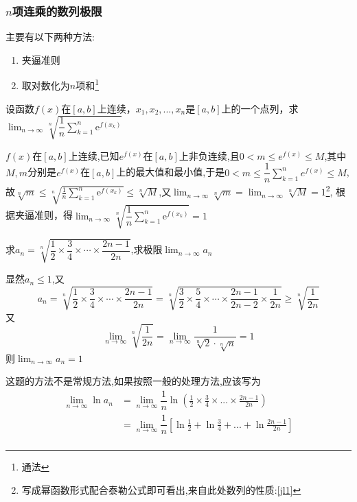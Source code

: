 \documentclass[8pt a4paper, oneside, UTF8]{ctexbook}
\begin{document}
\begin{sloppypar}
    \subsubsection{$n$项连乘的数列极限}
    主要有以下两种方法:
    \begin{enumerate}
        \item 夹逼准则
        \item 取对数化为$n$项和\footnote{通法}
    \end{enumerate}
    \begin{problem}
        设函数$f(x)$在$[a,b]$上连续，$x_1,x_2,...,x_n$是$[a,b]$上的一个点列，求$\lim_{n\to\infty}\sqrt[n]{\dfrac1n\sum_{k=1}^n\mathrm{e}^{f(x_k)}}$ 
    \end{problem}
    \begin{solution}
        $f(x)$在$[a,b]$上连续,已知$e^{f(x)}$在$[a,b]$上非负连续,且$0<m \leqslant e^{f(x)} \leqslant M$,其中$M,m$分别是$e^{f(x)}$在$[a,b]$上的最大值和最小值,于是$0<m\leqslant \dfrac{1}{n} \sum_{k=1}^{n}e^{f(x)} \leqslant M$,故$\sqrt[n]{m}\leqslant\sqrt[n]{\frac1n\sum_{k=1}^n\mathrm{e}^{f(x_k)}}\leqslant\sqrt[n]{M}$,又$\lim_{n\to\infty}\sqrt[n]{m}=\lim_{n\to\infty}\sqrt[n]{M}=1$\footnote{写成幂函数形式配合泰勒公式即可看出,来自此处数列的性质:\ref{jl1}}, 根据夹逼准则，得$\lim_{n\to\infty}\sqrt[n]{\dfrac1n\sum_{k=1}^n\mathrm{e}^{f(x_k)}}=1$ 
    \end{solution}
    \begin{problem}
        求$a_n=\sqrt[n]{\dfrac12\times\dfrac34\times\cdots\times\dfrac{2n-1}{2n}}$,求极限$\lim_{n \to \infty}a_n$
    \end{problem}
    \begin{solution}
        显然$a_n \leqslant 1$,又
        $$
            a_n=\sqrt[n]{\dfrac12\times\dfrac34\times\cdots\times\dfrac{2n-1}{2n}}=\sqrt[n]{\dfrac32\times\dfrac54\times\cdots\times\dfrac{2n-1}{2n-2}\times\dfrac1{2n}}\geqslant\sqrt[n]{\dfrac1{2n}}
        $$
        又
        $$
            \lim_{n\to\infty}\sqrt[n]{\dfrac1{2n}}=\lim_{n\to\infty}\dfrac1{\sqrt[n]{2}\cdot\sqrt[n]{n}}=1
        $$
        则$\lim_{n\to\infty}a_n=1$
    \end{solution}
    \begin{note}
        这题的方法不是常规方法,如果按照一般的处理方法,应该写为
        \begin{align*}
            \lim_{n \to \infty}\ln a_n & =\lim_{n \to \infty}\dfrac{1}{n}\ln(\frac{1}{2}\times \frac{3}{4} \times ... \times \frac{2n-1}{2n})\\
            & = \lim_{n \to \infty} \dfrac{1}{n}[\ln \frac{1}{2}+\ln \frac{3}{4}+...+\ln \frac{2n-1}{2n}]\\

\end{align*}
\end{note}
\end{sloppypar}
\end{document}

